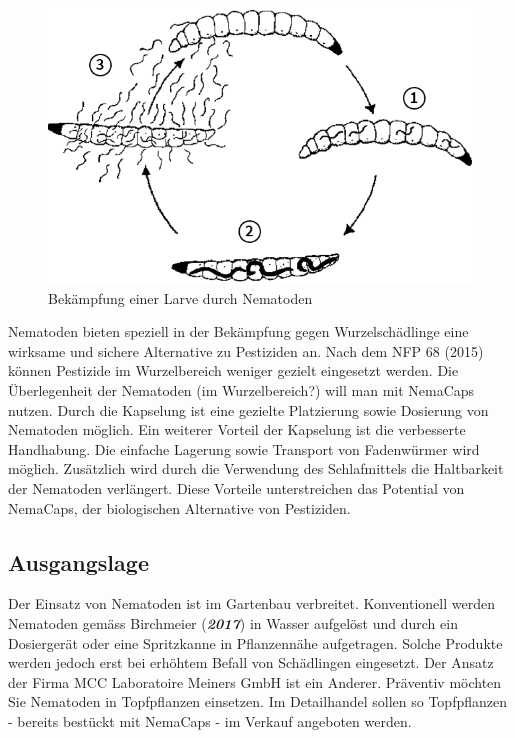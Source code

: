 \begin{figure}
	\includegraphics[scale=0.4]{Illustrationen/3-Einleitung/zyklus_nematoden.png}
\caption{Bekämpfung einer Larve durch Nematoden}
\label{fig:zyklus_Nematoden}
\end{figure}

	
Nematoden bieten speziell in der Bekämpfung gegen Wurzelschädlinge eine wirksame und sichere Alternative zu Pestiziden an. Nach dem NFP 68 (2015) können Pestizide im Wurzelbereich weniger gezielt eingesetzt werden. Die Überlegenheit der Nematoden (im Wurzelbereich?) will man mit NemaCaps nutzen. Durch die Kapselung ist eine gezielte Platzierung sowie Dosierung von Nematoden möglich. Ein weiterer Vorteil der Kapselung ist die verbesserte Handhabung. Die einfache Lagerung sowie Transport von Fadenwürmer wird möglich.  Zusätzlich wird durch die Verwendung des Schlafmittels die Haltbarkeit der Nematoden verlängert. Diese Vorteile unterstreichen das Potential von NemaCaps, der biologischen Alternative von Pestiziden.

\subsection{Ausgangslage}
Der Einsatz von Nematoden ist im Gartenbau verbreitet. Konventionell werden Nematoden gemäss Birchmeier (\textbf{\textit{2017}}) in Wasser aufgelöst und durch ein Dosiergerät oder eine Spritzkanne in Pflanzennähe aufgetragen. Solche Produkte werden jedoch erst bei erhöhtem Befall von Schädlingen eingesetzt. Der Ansatz der Firma MCC Laboratoire Meiners GmbH ist ein Anderer. Präventiv möchten Sie Nematoden in Topfpflanzen einsetzen. Im Detailhandel sollen so Topfpflanzen - bereits bestückt mit NemaCaps - im Verkauf angeboten werden. 
